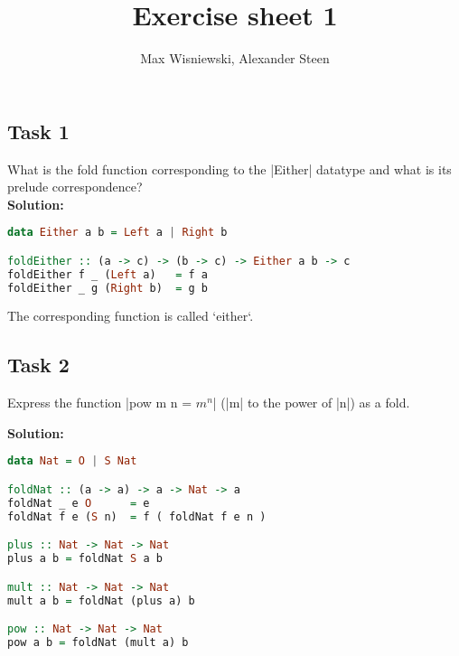 \documentclass[11pt,a4paper,ngerman]{article}
\date{}
\title{Exercise sheet 1}
\author{Max Wisniewski, Alexander Steen}
\begin{document}

\renewcommand{\figurename}{Figure}

\maketitle
\thispagestyle{fancy}

\subsection*{Task 1}

What is the fold function corresponding to the |Either| datatype and what is its prelude correspondence?\\

\textbf{Solution:}\\

\begin{lstlisting}[language=haskell]
data Either a b = Left a | Right b

foldEither :: (a -> c) -> (b -> c) -> Either a b -> c
foldEither f _ (Left a)   = f a
foldEither _ g (Right b)  = g b
\end{lstlisting}

The corresponding function is called `either`.

\subsection*{Task 2}

Express the function |pow m n = $m^n$| (|m| to the power of |n|)
as a fold.

\textbf{Solution:}\\

\begin{lstlisting}[language=haskell]
data Nat = O | S Nat

foldNat :: (a -> a) -> a -> Nat -> a
foldNat _ e O      = e
foldNat f e (S n)  = f ( foldNat f e n )

plus :: Nat -> Nat -> Nat
plus a b = foldNat S a b

mult :: Nat -> Nat -> Nat
mult a b = foldNat (plus a) b

pow :: Nat -> Nat -> Nat
pow a b = foldNat (mult a) b
\end{lstlisting}
\end{document}
